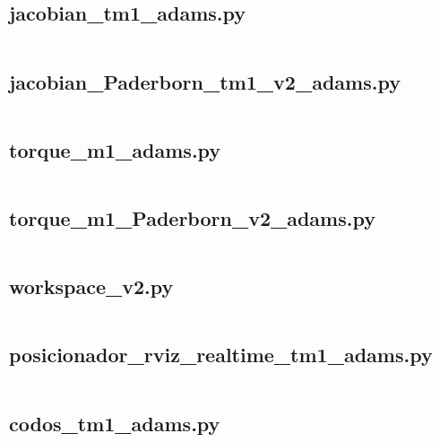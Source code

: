         \subsection{jacobian\_tm1\_adams.py}
        {\footnotesize 
            \inputminted{python}{Back/codigos_py/jacobian_tm1_adams.py}
            }
        \newpage
    
        \subsection{jacobian\_Paderborn\_tm1\_v2\_adams.py}
        {\footnotesize 
            \inputminted{python}{Back/codigos_py/jacobian_Paderborn_tm1_v2_adams.py}
            }
        \newpage    
    
        \subsection{torque\_m1\_adams.py}
        {\footnotesize 
            \inputminted{python}{Back/codigos_py/torque_m1_adams.py}
            }
        \newpage    
        
        \subsection{torque\_m1\_Paderborn\_v2\_adams.py}
        {\footnotesize 
            \inputminted{python}{Back/codigos_py/torque_m1_Paderborn_v2_adams.py}
            }
        \newpage    
        
        \subsection{workspace\_v2.py}
        {\footnotesize 
            \inputminted{python}{Back/codigos_py/workspace_v2.py}
            }
        \newpage   
        
        \subsection{posicionador\_rviz\_realtime\_tm1\_adams.py}
        {\footnotesize 
            \inputminted{python}{Back/codigos_py/posicionador_rviz_realtime_tm1_adams.py}
            }
        \newpage  
        
        \subsection{codos\_tm1\_adams.py}
        {\footnotesize 
            \inputminted{python}{Back/codigos_py/codos_tm1_adams.py}
            }
        \newpage   